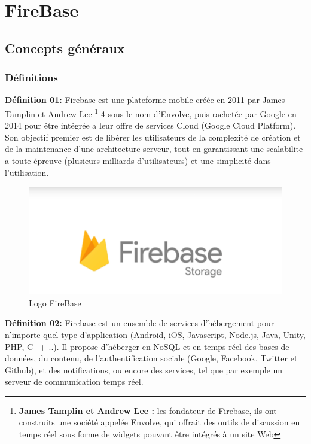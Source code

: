 \section{FireBase}
\subsection{Concepts généraux}

\subsubsection{Définitions}

\textbf{Définition 01:} Firebase est une plateforme mobile créée en 2011 par James Tamplin et Andrew Lee \footnote{\textbf{James Tamplin et Andrew Lee :} les fondateur de Firebase, ils ont construits une société appelée Envolve, qui offrait des outils de discussion en temps réel sous forme de widgets pouvant être intégrés à un site Web} 4 sous le nom d'Envolve, puis rachetée par Google en 2014 pour être intégrée a leur offre de services Cloud (Google Cloud Platform). Son objectif premier est de libérer les utilisateurs de la complexité de création et de la maintenance d'une architecture serveur, tout en garantissant une scalabilite a toute épreuve (plusieurs milliards d'utilisateurs) et une simplicité dans l'utilisation.

\begin{figure}[h]
	\centering
    \includegraphics[scale=0.6]{img/part2/3.1}
    \caption{Logo FireBase}
\end{figure}

\textbf{Définition 02:} Firebase est un ensemble de services d'hébergement pour n'importe quel type d'application (Android, iOS, Javascript, Node.js, Java, Unity, PHP, C++ ..). Il propose d'héberger en NoSQL et en temps réel des bases de données, du contenu, de l'authentification sociale (Google, Facebook, Twitter et Github), et des notifications, ou encore des services, tel que par exemple un serveur de communication temps réel.

